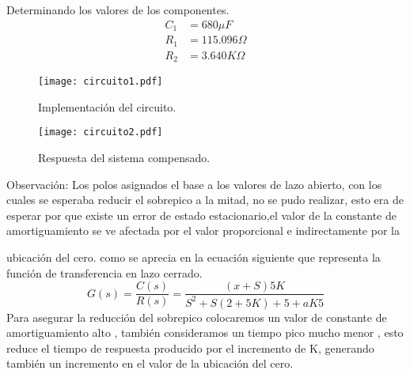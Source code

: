 \documentclass[10pt, a4paper]{report}
\begin{document}
   Determinando los valores de los componentes.
   \begin{equation*}
     \begin{split}
       C_1&=680 \mu F\\
       R_1&=115.096 \Omega\\
       R_2&= 3.640 K \Omega 
     \end{split}
   \end{equation*}
    \begin{figure}[htp]
      \centering
      \texttt{[image: circuito1.pdf]}
      \caption{Implementación del circuito.}
     
    \end{figure}

  
    \begin{figure}[htp]
      \centering
      \texttt{[image: circuito2.pdf]}
      \caption{Respuesta del sistema compensado.}
    
    \end{figure}
    Observación:
    Los polos asignados el base a los valores de lazo abierto, con los cuales se
    esperaba reducir el sobrepico a la mitad, no se pudo realizar, esto era de esperar
    por que existe un error de estado estacionario,el valor de la constante de
    amortiguamiento se ve afectada por el valor proporcional e indirectamente por la

    ubicación del cero. como se aprecia en la ecuación siguiente que representa la
función de transferencia en lazo cerrado.
\begin{equation*}
  G(s)= \frac{C(s)}{R(s)} = \frac{(x+S)5K}{S^2 + S(2+5K) + 5 +aK5}
\end{equation*}
Para asegurar la reducción del sobrepico colocaremos un valor de constante de
amortiguamiento alto , también consideramos un tiempo pico mucho menor , esto
reduce el tiempo de respuesta producido por el incremento de K, generando
también un incremento en el valor de la ubicación del cero.\\
\end{document}
